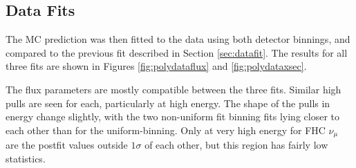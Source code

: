 \subsection{Data Fits}

The MC prediction was then fitted to the data using both detector binnings, and compared to the previous fit described in Section \ref{sec:datafit}. The results for all three fits are shown in Figures \ref{fig:polydataflux} and \ref{fig:polydataxsec}. 

The flux parameters are mostly compatible between the three fits. Similar high pulls are seen for each, particularly at high energy. The shape of the pulls in energy change slightly, with the two non-uniform fit binning fits lying closer to each other than for the uniform-binning. Only at very high energy for FHC $\nu_{\mu}$ are the postfit values outside $1\sigma$ of each other, but this region has fairly low statistics.


